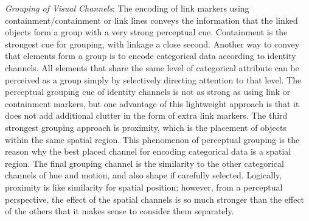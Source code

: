 \documentclass[
]{book}
\begin{document}
\emph{Grouping of Visual Channels}:
The encoding of link markers using containment/containment or link lines conveys the information that the linked objects form a group with a very strong perceptual cue. Containment is the strongest cue for grouping, with linkage a close second.
Another way to convey that elements form a group is to encode categorical data according to identity channels. All elements that share the same level of categorical attribute can be perceived as a group simply by selectively directing attention to that level. The perceptual grouping cue of identity channels is not as strong as using link or containment markers, but one advantage of this lightweight approach is that it does not add additional clutter in the form of extra link markers.
The third strongest grouping approach is proximity, which is the placement of objects within the same spatial region. This phenomenon of perceptual grouping is the reason why the best placed channel for encoding categorical data is a spatial region.
The final grouping channel is the similarity to the other categorical channels of hue and motion, and also shape if carefully selected. Logically, proximity is like similarity for spatial position; however, from a perceptual perspective, the effect of the spatial channels is so much stronger than the effect of the others that it makes sense to consider them separately.

  
\end{document}
